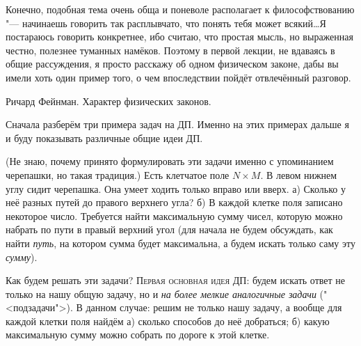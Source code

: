 

\epigraph{Конечно, подобная тема очень обща и поневоле располагает к философствованию "--- 
начинаешь говорить так расплывчато, что понять тебя может всякий\dots Я постараюсь говорить конкретнее, ибо считаю,
что простая мысль, но выраженная честно, полезнее туманных намёков. Поэтому в первой лекции, не 
вдаваясь в общие рассуждения, я просто расскажу об одном физическом законе, дабы вы имели хоть один 
пример того, о чем впоследствии пойдёт отвлечённый разговор.}{Ричард Фейнман. Характер физических 
законов.}

Сначала разберём три примера задач на ДП. Именно на этих примерах дальше я и буду показывать 
различные общие идеи ДП.

 (Не знаю, почему принято формулировать эти задачи именно с 
упоминанием черепашки, но такая традиция.) Есть клетчатое поле $N\times M$. В левом нижнем углу 
сидит черепашка. Она умеет ходить только вправо или вверх. а) Сколько у неё разных путей до правого 
верхнего угла? б) В каждой клетке поля записано некоторое число. Требуется найти максимальную сумму чисел, 
которую можно набрать по пути в правый верхний угол (для начала не будем обсуждать, как найти 
\textit{путь}, на котором сумма будет максимальна, а будем искать только саму эту \textit{сумму}).

Как будем решать эти задачи? \textsc{Первая основная идея ДП:} будем искать ответ не только на нашу 
общую задачу, но и \textit{на более мелкие аналогичные задачи} ("<подзадачи">). В данном случае: решим не только нашу 
задачу, а вообще для каждой клетки поля найдём а) сколько способов до неё добраться; б) какую 
максимальную сумму можно собрать по дороге к этой клетке.

